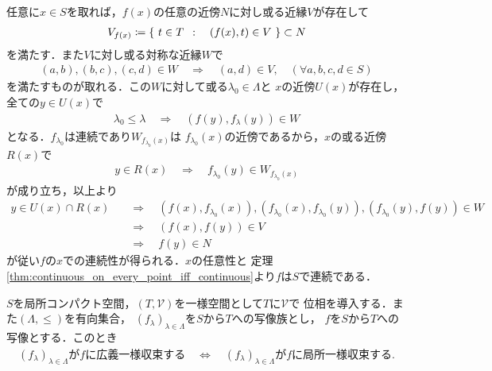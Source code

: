 	\begin{prf}
		任意に$x \in S$を取れば，$f(x)$の任意の近傍$N$に対し或る近縁$V$が存在して
		\begin{align}
			V_{f(x)} \coloneqq \left\{\ t \in T\ \, : \quad (f(x),t) \in V\ \right\} \subset N
		\end{align}
		を満たす．また$V$に対し或る対称な近縁$W$で
		\begin{align}
			(a,b),(b,c),(c,d) \in W \quad \Longrightarrow \quad
			(a,d) \in V,
			\quad (\forall a,b,c,d \in S)
		\end{align}
		を満たすものが取れる．この$W$に対して或る$\lambda_0 \in \Lambda$と
		$x$の近傍$U(x)$が存在し，全ての$y \in U(x)$で
		\begin{align}
			\lambda_0 \leq \lambda \quad \Longrightarrow \quad
			(f(y),f_\lambda(y)) \in W
		\end{align}
		となる．$f_{\lambda_0}$は連続であり$W_{f_{\lambda_0}(x)}$は
		$f_{\lambda_0}(x)$の近傍であるから，$x$の或る近傍$R(x)$で
		\begin{align}
			y \in R(x) \quad \Longrightarrow \quad
			f_{\lambda_0}(y) \in W_{f_{\lambda_0}(x)}
		\end{align}
		が成り立ち，以上より
		\begin{align}
			y \in U(x) \cap R(x) &\quad \Longrightarrow \quad
			(f(x),f_{\lambda_0}(x)),(f_{\lambda_0}(x),f_{\lambda_0}(y))
			,(f_{\lambda_0}(y),f(y)) \in W \\
			&\quad \Longrightarrow \quad (f(x),f(y)) \in V \\
			&\quad \Longrightarrow \quad f(y) \in N
		\end{align}
		が従い$f$の$x$での連続性が得られる．$x$の任意性と
		定理\ref{thm:continuous_on_every_point_iff_continuous}より$f$は$S$で連続である．
		\QED
	\end{prf}
	
	\begin{screen}
		\begin{thm}
		\label{thm:compact_unif_conv_iff_locally_unif_conv_if_locally_compact}
			$S$を局所コンパクト空間，$(T,\mathscr{V})$を一様空間として$T$に$\mathscr{V}$で
			位相を導入する．また$(\Lambda,\leq)$を有向集合，
			$(f_\lambda)_{\lambda \in \Lambda}$を$S$から$T$への写像族とし，
			$f$を$S$から$T$への写像とする．このとき
			\begin{align}
				\mbox{$(f_\lambda)_{\lambda \in \Lambda}$が$f$に広義一様収束する} 
				\quad \Longleftrightarrow \quad
				\mbox{$(f_\lambda)_{\lambda \in \Lambda}$が$f$に局所一様収束する}.
			\end{align}
		\end{thm}
	\end{screen}
	
